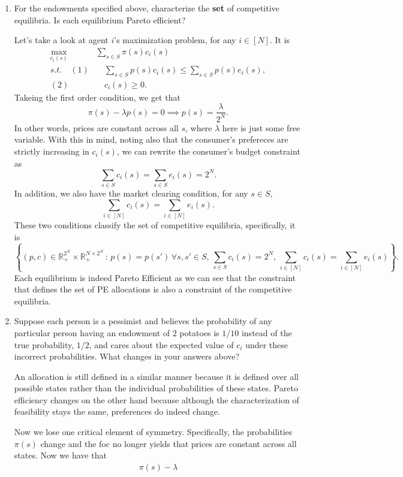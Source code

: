 \documentclass[11pt,english]{article}
\begin{document}
\begin{enumerate}
    \item[(3)] For the endowments specified above, characterize the \textbf{set}
        of competitive equilibria. Is each equilibrium Pareto efficient?
    \begin{solution}
 Let's take a look at agent $i$'s maximization problem, for any $i\in [N]$. It is
\begin{align*}
\max_{c_i(s)}\quad &\sum_{s\in S} \pi(s) c_i(s)\\
s.t.\quad (1)&\quad \sum_{s\in S}p(s) c_i(s) \leq \sum_{s\in S}p(s) e_i(s),\\
(2)&\quad c_i(s) \geq 0.
\end{align*} Takeing the first order condition, we get that $$\pi(s) - \lambda p(s) = 0 \implies p(s) = \frac{\lambda}{2^N}.$$In other words, prices are constant across all $s$, where $\lambda$ here is just some free variable. With this in mind, noting also that the consumer's prefereces are strictly increasing in $c_i(s)$, we can rewrite the consumer's budget constraint as $$\sum_{s\in S}c_i(s) = \sum_{s\in S} e_i(s) = 2^N.$$In addition, we also have the market clearing condition, for any $s\in S$, $$\sum_{i\in [N]}c_i(s) = \sum_{i\in [N]}e_i(s).$$ These two conditions classify the set of competitive equilibria, specifically, it is $$\boxed{\left\{(p, c) \in \mathbb{R}_+^{2^N}\times \mathbb{R}_+^{N\times 2^N}\,:\, p(s) = p(s') \,\forall s,s'\in S,\,\sum_{s\in S}c_i(s) = 2^N,\, \sum_{i\in [N]}c_i(s) = \sum_{i\in [N]}e_i(s)\right\}.}$$Each equilibrium is indeed Pareto Efficient as we can see that the constraint that defines the set of PE allocations is also a constraint of the competitive equilibria.
    \end{solution}
 
    \item[(4)] Suppose each person is a pessimist and believes the probability
        of any particular person having an endowment of 2 potatoes is $1/10$
        instead of the true probability, $1/2$, and cares about the expected
        value of $c_i$ under these incorrect probabilities. What changes in
        your answers above?
    \begin{solution}
An allocation is still defined in a similar manner because it is defined over all possible states rather than the individual probabilities of these states. Pareto efficiency changes on the other hand because although the characterization of feasibility stays the same, preferences do indeed change.

 Now we lose one critical element of symmetry. Specifically, the probabilities $\pi(s)$ change and the foc no longer yields that prices are constant across all states. Now we have that 
\begin{align*}
\pi(s) - \lambda 
\end{align*}
    \end{solution}
 

\end{enumerate}
\end{document}
